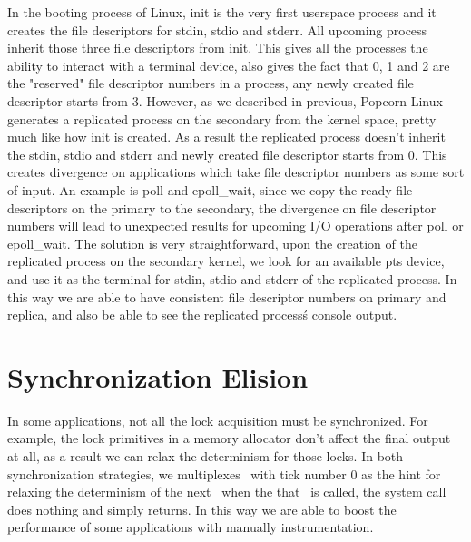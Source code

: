 In the booting process of Linux, init is the very first userspace process and it creates the file descriptors for stdin, stdio and stderr. All upcoming process inherit those three file descriptors from init. This gives all the processes the ability to interact with a terminal device, also gives the fact that 0, 1 and 2 are the "reserved" file descriptor numbers in a process, any newly created file descriptor starts from 3. However, as we described in previous, Popcorn Linux generates a replicated process on the secondary from the kernel space, pretty much like how init is created. As a result the replicated process doesn't inherit the stdin, stdio and stderr and newly created file descriptor starts from 0. This creates divergence on applications which take file descriptor numbers as some sort of input. An example is poll and epoll\_wait, since we copy the ready file descriptors on the primary to the secondary, the divergence on file descriptor numbers will lead to unexpected results for upcoming I/O operations after poll or epoll\_wait. The solution is very straightforward, upon the creation of the replicated process on the secondary kernel, we look for an available pts device, and  use it as the terminal for stdin, stdio and stderr of the replicated process. In this way we are able to have consistent file descriptor numbers on primary and replica, and also be able to see the replicated process\'s console output.

\section{Synchronization Elision} \label{sec:elision}
In some applications, not all the lock acquisition must be synchronized. For example, the lock primitives in a memory allocator don't affect the final output at all, as a result we can relax the determinism for those locks. In both synchronization strategies, we multiplexes \dettick\ with tick number 0 as the hint for relaxing the determinism of the next \detstart\, when the that \detstart\ is called, the system call does nothing and simply returns. In this way we are able to boost the performance of some applications with manually instrumentation.